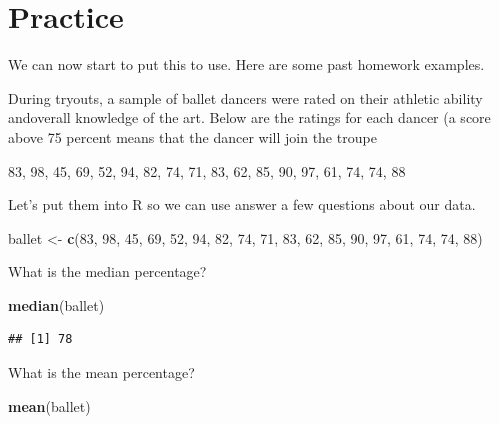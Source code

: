 \documentclass[]{book}
\newenvironment{Shaded}{\begin{snugshade}}{\end{snugshade}}
\newcommand{\KeywordTok}[1]{\textcolor[rgb]{0.13,0.29,0.53}{\textbf{#1}}}
\newcommand{\DecValTok}[1]{\textcolor[rgb]{0.00,0.00,0.81}{#1}}
\newcommand{\StringTok}[1]{\textcolor[rgb]{0.31,0.60,0.02}{#1}}
\newcommand{\NormalTok}[1]{#1}
\theoremstyle{definition}
\theoremstyle{definition}
\theoremstyle{definition}
\theoremstyle{remark}
\begin{document}
\section{Practice}\label{practice}

We can now start to put this to use. Here are some past homework
examples.

During tryouts, a sample of ballet dancers were rated on their athletic
ability andoverall knowledge of the art. Below are the ratings for each
dancer (a score above 75 percent means that the dancer will join the
troupe

83, 98, 45, 69, 52, 94, 82, 74, 71, 83, 62, 85, 90, 97, 61, 74, 74, 88

Let's put them into R so we can use answer a few questions about our
data.

\begin{Shaded}
\begin{Highlighting}[]
\NormalTok{ballet <-}\StringTok{ }\KeywordTok{c}\NormalTok{(}\DecValTok{83}\NormalTok{, }\DecValTok{98}\NormalTok{, }\DecValTok{45}\NormalTok{, }\DecValTok{69}\NormalTok{, }\DecValTok{52}\NormalTok{, }\DecValTok{94}\NormalTok{, }\DecValTok{82}\NormalTok{, }\DecValTok{74}\NormalTok{, }\DecValTok{71}\NormalTok{, }\DecValTok{83}\NormalTok{, }\DecValTok{62}\NormalTok{, }\DecValTok{85}\NormalTok{, }\DecValTok{90}\NormalTok{, }\DecValTok{97}\NormalTok{, }\DecValTok{61}\NormalTok{, }\DecValTok{74}\NormalTok{, }\DecValTok{74}\NormalTok{, }\DecValTok{88}\NormalTok{)}
\end{Highlighting}
\end{Shaded}

What is the median percentage?

\begin{Shaded}
\begin{Highlighting}[]
\KeywordTok{median}\NormalTok{(ballet)}
\end{Highlighting}
\end{Shaded}

\begin{verbatim}
## [1] 78
\end{verbatim}

What is the mean percentage?

\begin{Shaded}
\begin{Highlighting}[]
\KeywordTok{mean}\NormalTok{(ballet)}
\end{Highlighting}
\end{Shaded}
\end{document}
